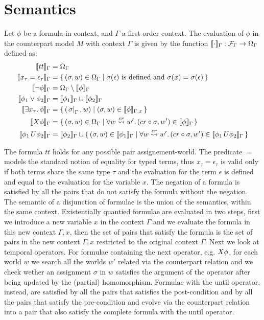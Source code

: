 \section{Semantics}

\begin{definition}
Let $\phi$ be a formula-in-context, and $\Gamma$ a first-order context.
The evaluation of $\phi$ in the counterpart model $M$ with context $\Gamma$ is given by the function
$\llbracket \cdot \rrbracket_{\Gamma} : \mathcal{F}_\Gamma \to \Omega_{\Gamma}$ defined as:
\begin{align*}
  \llbracket tt \rrbracket_{\Gamma} &= \Omega_{\Gamma} \\
  \llbracket x_\tau = \epsilon_\tau \rrbracket_{\Gamma} &= \set{(\sigma, w) \in \Omega_{\Gamma} |
      \sigma(\epsilon) \text{ is defined and } \sigma(x) = \sigma(\epsilon)} \\
  \llbracket \neg\phi \rrbracket_{\Gamma} &= \Omega_{\Gamma} \setminus \llbracket \phi \rrbracket_{\Gamma} \\
  \llbracket \phi_1 \lor \phi_2 \rrbracket_{\Gamma} &= \llbracket \phi_1 \rrbracket_{\Gamma} \cup \llbracket \phi_2 \rrbracket_{\Gamma} \\
  \llbracket \exists {x_\tau} \ldotp {\phi} \rrbracket_{\Gamma}{} &= \set{(\left.\sigma\right|_\Gamma, w) | (\sigma, w) \in
      \llbracket \phi \rrbracket_{\Gamma, x}} \\
  \llbracket X{\phi} \rrbracket_{\Gamma}{} &= \set{(\sigma, w) \in \Omega_{\Gamma} |
      \forall {w \overset{cr}{\rightsquigarrow} w'} \ldotp {(cr \circ \sigma, w') \in \llbracket \phi \rrbracket_{\Gamma}} } \\
  \llbracket {\phi_1}\,U {\phi_2} \rrbracket_{\Gamma}{} &= \llbracket \phi_2 \rrbracket_{\Gamma} \cup \set{(\sigma, w) \in \llbracket \phi_1 \rrbracket_{\Gamma} |
      \forall {w \overset{cr}{\rightsquigarrow} w'} \ldotp {(cr \circ \sigma, w') \in \llbracket {\phi_1}\,U {\phi_2} \rrbracket_{\Gamma}{}}}
\end{align*}
\end{definition}

The formula $tt$ holds for any possible pair assignement-world. The predicate $=$ models the standard notion of equality
for typed terms, thus $x_\tau = \epsilon_\tau$ is valid only if both terms share the same type $\tau$ and the evaluation
for the term $\epsilon$ is defined and equal to the evaluation for the variable $x$. The negation of a formula is
satisfied by all the pairs that do not satisfy the formula without the negation. The semantic of a disjunction of
formulae is the union of the semantics, within the same context.
Existentially quantied formulae are evaluated in two steps, first we introduce a new variable $x$ in the context
$\Gamma$ and we evaluate the formula in this new context $\Gamma, x$, then the set of pairs that satisfy the formula is
the set of pairs in the new context $\Gamma, x$ restricted to the original context $\Gamma$.
Next we look at temporal operators. For formulae containing the next operator, e.g. $X{\phi}$, for each world $w$ we
search all the worlds $w'$ related via the counterpart relation and we check wether an assignment $\sigma$ in $w$
satisfies the argument of the operator after being updated by the (partial) homomorphism.
Formulae with the until operator, instead, are satisfied by all the pairs that satisfies the post-condition and by all
the pairs that satisfy the pre-condition and evolve via the counterpart relation into a pair that also satisfy the
complete formula with the until operator.

